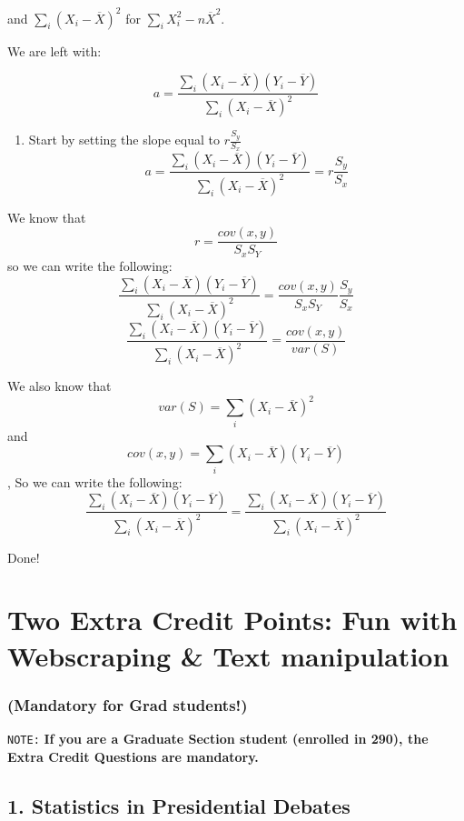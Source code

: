 \documentclass[11pt]{article}
\providecommand{\tightlist}{%
      \setlength{\itemsep}{0pt}\setlength{\parskip}{0pt}}
\begin{document}
and \(\sum_{i}{(X_i - \overline{X})^2}\) for
\(\sum_{i}{X_i^2} - n\overline{X}^2\).

We are left with:

\[a = \frac{\sum_{i}{(X_i - \overline{X})(Y_i - \overline{Y})}}{\sum_{i}{(X_i - \overline{X})^2}} \]

    \begin{enumerate}
\def\labelenumi{\roman{enumi})}
\setcounter{enumi}{1}
\tightlist
\item
  Start by setting the slope equal to \(r\frac{S_y}{S_x}\)
  \[a = \frac{\sum_{i}{(X_i - \overline{X})(Y_i - \overline{Y})}}{\sum_{i}{(X_i - \overline{X})^2}} = r\frac{S_y}{S_x}\]
\end{enumerate}

We know that \[r = \frac{cov(x, y)}{S_xS_Y}\] so we can write the
following:
\[\frac{\sum_{i}{(X_i - \overline{X})(Y_i - \overline{Y})}}{\sum_{i}{(X_i - \overline{X})^2}} = \frac{cov(x, y)}{S_xS_Y} \frac{S_y}{S_x} \]
\[\frac{\sum_{i}{(X_i - \overline{X})(Y_i - \overline{Y})}}{\sum_{i}{(X_i - \overline{X})^2}} = \frac{cov(x, y)}{var(S)}\]

We also know that \[var(S) = \sum_{i}{(X_i - \overline{X})^2}\] and
\[cov(x, y) = \sum_{i}{(X_i - \overline{X})(Y_i - \overline{Y})}\], So
we can write the following:
\[\frac{\sum_{i}{(X_i - \overline{X})(Y_i - \overline{Y})}}{\sum_{i}{(X_i - \overline{X})^2}} = \frac{\sum_{i}{(X_i - \overline{X})(Y_i - \overline{Y})}}{\sum_{i}{(X_i - \overline{X})^2}}\]

Done!

    \hypertarget{two-extra-credit-points-fun-with-webscraping-text-manipulation}{%
\section{Two Extra Credit Points: Fun with Webscraping \& Text
manipulation}\label{two-extra-credit-points-fun-with-webscraping-text-manipulation}}

\hypertarget{mandatory-for-grad-students}{%
\subsubsection{(Mandatory for Grad
students!)}\label{mandatory-for-grad-students}}

    \texttt{NOTE:} \textbf{If you are a Graduate Section student (enrolled
in 290), the Extra Credit Questions are mandatory.}

    \hypertarget{statistics-in-presidential-debates}{%
\subsection{1. Statistics in Presidential
Debates}\label{statistics-in-presidential-debates}}
\end{document}
